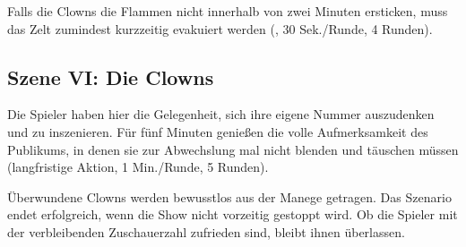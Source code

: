 {		Falls die Clowns die Flammen nicht innerhalb von zwei Minuten ersticken, muss das Zelt zumindest kurzzeitig evakuiert werden (, 30 Sek./Runde, 4 Runden).

		\subsection{Szene VI: Die Clowns}

		Die Spieler haben hier die Gelegenheit, sich ihre eigene Nummer auszudenken und zu inszenieren. Für fünf Minuten genießen die volle Aufmerksamkeit des Publikums, in denen sie zur Abwechslung mal nicht blenden und täuschen müssen (langfristige Aktion, 1 Min./Runde, 5 Runden).


		\noindent
		Überwundene Clowns werden bewusstlos aus der Manege getragen. Das Szenario endet erfolgreich, wenn die Show nicht vorzeitig gestoppt wird. Ob die Spieler mit der verbleibenden Zuschauerzahl zufrieden sind, bleibt ihnen überlassen.

}
